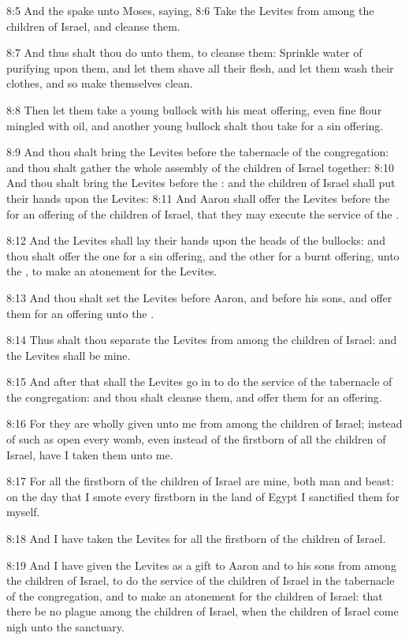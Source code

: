 8:5 And the \LORD spake unto Moses, saying, 8:6 Take the Levites from
among the children of Israel, and cleanse them.

8:7 And thus shalt thou do unto them, to cleanse them: Sprinkle water
of purifying upon them, and let them shave all their flesh, and let
them wash their clothes, and so make themselves clean.

8:8 Then let them take a young bullock with his meat offering, even
fine flour mingled with oil, and another young bullock shalt thou take
for a sin offering.

8:9 And thou shalt bring the Levites before the tabernacle of the
congregation: and thou shalt gather the whole assembly of the children
of Israel together: 8:10 And thou shalt bring the Levites before the
\LORD: and the children of Israel shall put their hands upon the
Levites: 8:11 And Aaron shall offer the Levites before the \LORD for an
offering of the children of Israel, that they may execute the service
of the \LORD.

8:12 And the Levites shall lay their hands upon the heads of the
bullocks: and thou shalt offer the one for a sin offering, and the
other for a burnt offering, unto the \LORD, to make an atonement for
the Levites.

8:13 And thou shalt set the Levites before Aaron, and before his sons,
and offer them for an offering unto the \LORD.

8:14 Thus shalt thou separate the Levites from among the children of
Israel: and the Levites shall be mine.

8:15 And after that shall the Levites go in to do the service of the
tabernacle of the congregation: and thou shalt cleanse them, and offer
them for an offering.

8:16 For they are wholly given unto me from among the children of
Israel; instead of such as open every womb, even instead of the
firstborn of all the children of Israel, have I taken them unto me.

8:17 For all the firstborn of the children of Israel are mine, both
man and beast: on the day that I smote every firstborn in the land of
Egypt I sanctified them for myself.

8:18 And I have taken the Levites for all the firstborn of the
children of Israel.

8:19 And I have given the Levites as a gift to Aaron and to his sons
from among the children of Israel, to do the service of the children
of Israel in the tabernacle of the congregation, and to make an
atonement for the children of Israel: that there be no plague among
the children of Israel, when the children of Israel come nigh unto the
sanctuary.

